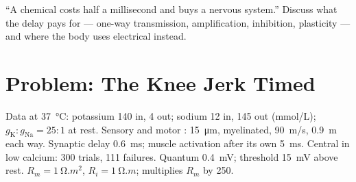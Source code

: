 \begin{exercise}[$\star\star\star$]\label{exo:b2:neurons-synapses:12}
``A chemical  costs half a millisecond and buys a nervous
system.'' Discuss what the delay pays for --- one-way transmission,
amplification, inhibition, plasticity --- and where the body uses
electrical  instead.
\end{exercise}

\section{Problem: The Knee Jerk Timed}

\begin{problem}
\label{pb:b2:neurons-synapses:1}
Data at \qty{37}{\celsius}: potassium 140 in, 4 out; sodium 12 in,
145 out (\unit{mmol/L}); $g_{\mathrm K} : g_{\mathrm{Na}} = 25 : 1$
at rest. Sensory and motor : \qty{15}{\micro m}, myelinated,
\qty{90}{m/s}, \qty{0.9}{m} each way. Synaptic delay \qty{0.6}{ms};
muscle activation after its own  \qty{5}{ms}.
Central  in low calcium: 300 trials, 111 failures. Quantum
\qty{0.4}{mV}; threshold \qty{15}{mV} above rest. $R_m =
\qty{1}{\ohm.m^2}$, $R_i = \qty{1}{\ohm.m}$;  multiplies $R_m$
by 250.


\end{problem}
